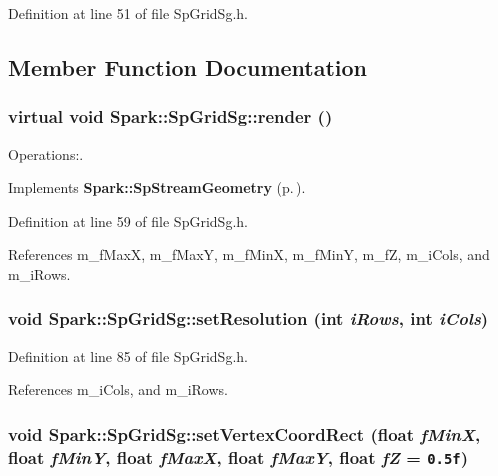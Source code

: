 Definition at line 51 of file Sp\-Grid\-Sg.h.

\subsection{Member Function Documentation}
\subsubsection{\setlength{\rightskip}{0pt plus 5cm}virtual void Spark::Sp\-Grid\-Sg::render ()\hspace{0.3cm}{\tt  [inline, virtual]}}\label{classSpark_1_1SpGridSg_a2}


Operations:. 



Implements {\bf Spark::Sp\-Stream\-Geometry} {\rm (p.\,\pageref{classSpark_1_1SpStreamGeometry_a0})}.

Definition at line 59 of file Sp\-Grid\-Sg.h.

References m\_\-f\-Max\-X, m\_\-f\-Max\-Y, m\_\-f\-Min\-X, m\_\-f\-Min\-Y, m\_\-f\-Z, m\_\-i\-Cols, and m\_\-i\-Rows.
\subsubsection{\setlength{\rightskip}{0pt plus 5cm}void Spark::Sp\-Grid\-Sg::set\-Resolution (int {\em i\-Rows}, int {\em i\-Cols})\hspace{0.3cm}{\tt  [inline]}}\label{classSpark_1_1SpGridSg_a3}


Definition at line 85 of file Sp\-Grid\-Sg.h.

References m\_\-i\-Cols, and m\_\-i\-Rows.
\subsubsection{\setlength{\rightskip}{0pt plus 5cm}void Spark::Sp\-Grid\-Sg::set\-Vertex\-Coord\-Rect (float {\em f\-Min\-X}, float {\em f\-Min\-Y}, float {\em f\-Max\-X}, float {\em f\-Max\-Y}, float {\em f\-Z} = {\tt 0.5f})\hspace{0.3cm}{\tt  [inline]}}\label{classSpark_1_1SpGridSg_a4}


